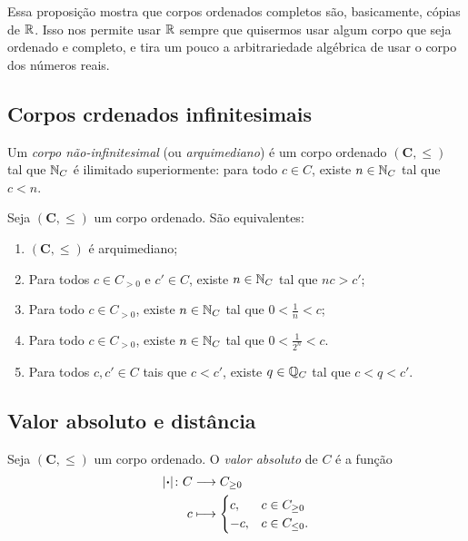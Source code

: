 Essa proposição mostra que corpos ordenados completos são, basicamente, cópias de $\mathbb{R}$. Isso nos permite usar $\mathbb{R}$ sempre que quisermos usar algum corpo que seja ordenado e completo, e tira um pouco a arbitrariedade algébrica de usar o corpo dos números reais.

\subsection{Corpos crdenados infinitesimais}

\begin{definition}
Um \emph{corpo não-infinitesimal} (ou \emph{arquimediano}) é um corpo ordenado $(\bm C,\leq)$ tal que $\mathbb{N}_C$ é ilimitado superiormente: para todo $c \in C$, existe $n \in \mathbb{N}_C$ tal que $c < n$.
\end{definition}

\begin{proposition}
Seja $(\bm C,\leq)$ um corpo ordenado. São equivalentes:
	\begin{enumerate}
	\item $(\bm C,\leq)$ é arquimediano;
	\item Para todos $c \in C_{>0}$ e $c' \in C$, existe $n \in \mathbb{N}_C$ tal que $nc>c'$;
	\item Para todo $c \in C_{>0}$, existe $n \in \mathbb{N}_C$ tal que $0<\frac{1}{n}<c$;
	\item Para todo $c \in C_{>0}$, existe $n \in \mathbb{N}_C$ tal que $0<\frac{1}{2^n}<c$.
	\item Para todos $c,c' \in C$ tais que $c<c'$, existe $q \in \mathbb{Q}_C$ tal que $c < q < c'$.
	\end{enumerate}
\end{proposition}



\subsection{Valor absoluto e distância}


\begin{definition}
Seja $(\bm C,\leq)$ um corpo ordenado. O \emph{valor absoluto} de $C$ é a função
	\begin{align*}
	\func{\abs{\var}}{C}{C_{\geq 0}}{c}{
		\begin{cases}
			c,& c \in C_{\geq 0} \\
			-c,& c \in C_{\leq 0}.
		\end{cases}
	}
	\end{align*}
\end{definition}

